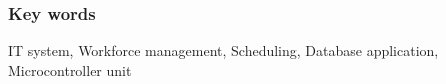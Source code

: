 \subsubsection*{Key words}
\begin{otherlanguage}{british}
    IT system, Workforce management, Scheduling, Database application, Microcontroller unit
\end{otherlanguage}

